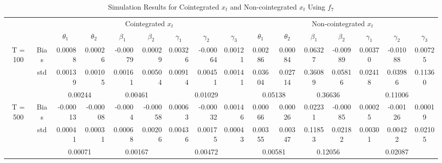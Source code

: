 \documentclass[a4paper,12pt,times,numbered,print,index]{report}
\numberwithin{equation}{section}
\begin{document}
\begin{table}[htbp]
	\centering
	\caption{Simulation Results for Cointegrated $x_t$ and Non-cointegrated $x_t$ Using $f_7$}
	\begin{adjustbox}{max width=\textwidth}
	\begin{tabular}{cccccccccccccccc}
		\toprule
		&       & \multicolumn{7}{c}{Cointegrated $x_t$}                               & \multicolumn{7}{c}{Non-cointegrated $x_t$} \\
		&       & $\theta_1$ & $\theta_2$ & $\beta_1$ & $\beta_2$ & $\gamma_1$ & $\gamma_2$ & $\gamma_3$ & $\theta_1$ & $\theta_2$ & $\beta_1$ & $\beta_2$ & $\gamma_1$ & $\gamma_2$ & $\gamma_3$ \\
		\midrule
		\multirow{3}[1]{*}{T = 100} & Bias  & \multicolumn{1}{r}{\textcolor[rgb]{ 0,  .439,  .753}{0.00088}} & \multicolumn{1}{r}{0.00026} & \multicolumn{1}{r}{-0.00079} & \multicolumn{1}{r}{0.00029} & \multicolumn{1}{r}{0.00326} & \multicolumn{1}{r}{-0.00064} & \multicolumn{1}{r}{0.00121} & \textcolor[rgb]{ 0,  .439,  .753}{0.00286} & 0.00084 & 0.06327 & -0.00989 & 0.00370 & -0.01088 & 0.00725 \\
		& std   & \multicolumn{1}{r}{0.00139} & \multicolumn{1}{r}{0.00105} & \multicolumn{1}{r}{0.00161} & \multicolumn{1}{r}{0.00504} & \multicolumn{1}{r}{0.00914} & \multicolumn{1}{r}{0.00451} & \multicolumn{1}{r}{0.00141} & 0.03604 & 0.02714 & 0.36089 & 0.05816 & 0.02418 & 0.03986 & 0.11360 \\
		&       & \multicolumn{2}{c}{0.00244} & \multicolumn{2}{c}{0.00461} & \multicolumn{3}{c}{0.01029} & \multicolumn{2}{c}{0.05138} & \multicolumn{2}{c}{0.36636} & \multicolumn{3}{c}{0.11006} \\
		\multirow{3}[0]{*}{T = 500} & Bias  & \multicolumn{1}{r}{\textcolor[rgb]{ 0,  .439,  .753}{-0.00013}} & \multicolumn{1}{r}{-0.00008} & \multicolumn{1}{r}{-0.0004} & \multicolumn{1}{r}{-0.00058} & \multicolumn{1}{r}{0.00063} & \multicolumn{1}{r}{-0.00032} & \multicolumn{1}{r}{0.00146} & \textcolor[rgb]{ 0,  .439,  .753}{0.00066} & 0.00026 & 0.02231 & -0.00085 & 0.00025 & -0.00126 & 0.00019 \\
		& std   & \multicolumn{1}{r}{0.00041} & \multicolumn{1}{r}{0.00031} & \multicolumn{1}{r}{0.00068} & \multicolumn{1}{r}{0.00206} & \multicolumn{1}{r}{0.00436} & \multicolumn{1}{r}{0.00175} & \multicolumn{1}{r}{0.00043} & 0.00355 & 0.00347 & 0.11853 & 0.02182 & 0.00301 & 0.00422 & 0.02105 \\
		&       & \multicolumn{2}{c}{0.00071} & \multicolumn{2}{c}{0.00167} & \multicolumn{3}{c}{0.00472} & \multicolumn{2}{c}{0.00581} & \multicolumn{2}{c}{0.12056} & \multicolumn{3}{c}{0.02087} \\

\end{tabular}
\end{adjustbox}
\end{table}
\end{document}
